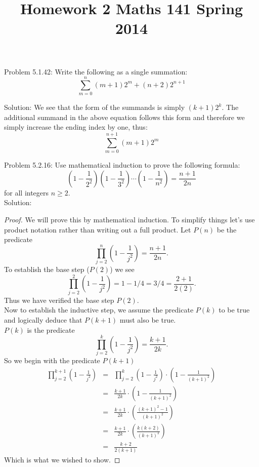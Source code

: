 \documentclass[10 pt]{amsart}
\theoremstyle{definition}
\theoremstyle{remark}
\numberwithin{equation}{subsection}
\begin{document}
\title{Homework 2 Maths 141 Spring 2014}
\maketitle 

Problem 5.1.42: Write the following as a single summation:
\[
\sum_{m=0}^{n} (m+1)2^m   + (n+2)2^{n+1}
\]

Solution: We see that the form of the summands is simply $(k+1)2^k$.  The additional summand in the above equation follows this form and therefore we simply increase the ending index by one, thus:
\[
\sum_{m=0}^{n+1} (m+1)2^m  
\]
 


\newpage

Problem 5.2.16: Use mathematical induction to prove the following formula:
\[
\left(1-\frac{1}{2^2}\right)\left(1-\frac{1}{3^2}\right)\cdots\left(1-\frac{1}{n^2}\right) = \frac{n+1}{2n}
\]
for all integers $n\geq 2$.\\


Solution:
\begin{proof}
We will prove this by mathematical induction.  To simplify things let's use product notation rather than writing out a full product.  Let $P(n)$ be the predicate
\[
\prod_{j=2}^{n} \left(1-\frac{1}{j^2}\right) = \frac{n+1}{2n}.
\]
To establish the base step ($P(2)$) we see
\[
\prod_{j=2}^{2} \left(1-\frac{1}{j^2}\right) = 1-1/4=3/4 = \frac{2+1}{2(2)}.
\]
Thus we have verified the base step $P(2)$.\\
Now to establish the inductive step, we assume the predicate $P(k)$ to be true and logically deduce that $P(k+1)$ must also be true.\\
$P(k)$ is the predicate
\[
\prod_{j=2}^{k} \left(1-\frac{1}{j^2}\right) = \frac{k+1}{2k}.
\]
So we begin with the predicate $P(k+1)$
\begin{eqnarray*}
\prod_{j=2}^{k+1} \left(1-\frac{1}{j^2}\right) &=& \prod_{j=2}^{k} \left(1-\frac{1}{j^2}\right) \cdot \left(1-\frac{1}{(k+1)^2}\right)\\
&=& \frac{k+1}{2k}\cdot \left(1-\frac{1}{(k+1)^2}\right)\\
&=& \frac{k+1}{2k}\cdot \left(\frac{(k+1)^2-1}{(k+1)^2}\right)\\
 &=& \frac{k+1}{2k}\cdot \left(\frac{k(k+2)}{(k+1)^2}\right)\\
 &=& \frac{k+2}{2(k+1)}
\end{eqnarray*}
Which is what we wished to show.
\end{proof}
\end{document}
